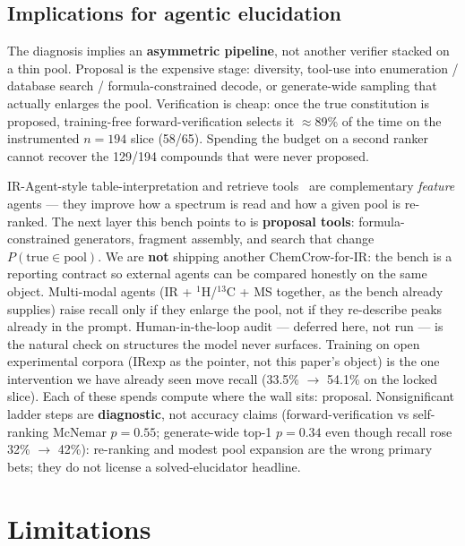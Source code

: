 \documentclass{article}
\begin{document}
\subsection{Implications for agentic elucidation}
\label{sec:agentic}

The diagnosis implies an \textbf{asymmetric pipeline}, not another verifier stacked on a thin
pool.
Proposal is the expensive stage: diversity, tool-use into enumeration / database search /
formula-constrained decode, or generate-wide sampling that actually enlarges the pool.
Verification is cheap: once the true constitution is proposed, training-free
forward-verification selects it $\approx$89\% of the time on the instrumented $n{=}194$
slice (58/65).
Spending the budget on a second ranker cannot recover the 129/194 compounds that were never
proposed.

IR-Agent-style table-interpretation and retrieve tools~\citep{noh2025iragent} are complementary
\emph{feature} agents --- they improve how a spectrum is read and how a given pool is
re-ranked.
The next layer this bench points to is \textbf{proposal tools}: formula-constrained
generators, fragment assembly, and search that change $P(\text{true}\in\text{pool})$.
We are \textbf{not} shipping another ChemCrow-for-IR: the bench is a reporting contract
so external agents can be compared honestly on the same object.
Multi-modal agents (IR + $^1$H/$^{13}$C + MS together, as the bench already supplies) raise
recall only if they enlarge the pool, not if they re-describe peaks already in the prompt.
Human-in-the-loop audit --- deferred here, not run --- is the natural check on structures
the model never surfaces.
Training on open experimental corpora (IRexp as the pointer, not this paper's object) is the
one intervention we have already seen move recall (33.5\% $\to$ 54.1\% on the locked slice).
Each of these spends compute where the wall sits: proposal.
Nonsignificant ladder steps are \textbf{diagnostic}, not accuracy claims
(forward-verification vs self-ranking McNemar $p{=}0.55$; generate-wide top-1 $p{=}0.34$
even though recall rose 32\% $\to$ 42\%): re-ranking and modest pool expansion are the wrong
primary bets; they do not license a solved-elucidator headline.

\section{Limitations}
\label{sec:limitations}
\end{document}
